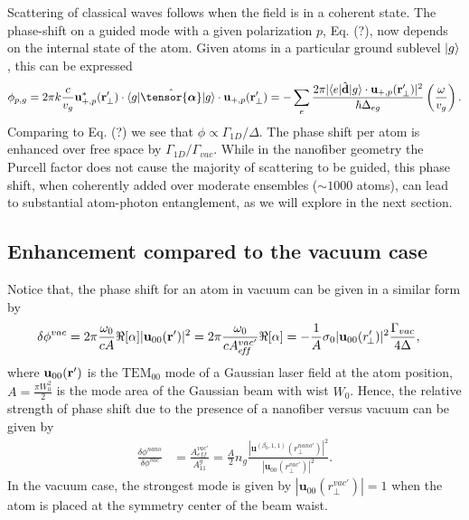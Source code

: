 \documentclass[preprint,aps,pra,onecolumn]{revtex4-1} %
\begin{document}
Scattering of classical waves follows when the field is in a coherent state.  The phase-shift on a guided mode with a given polarization $p$, Eq. (?), now depends on the internal state of the atom.  Given atoms in a particular ground sublevel $\lvert{g}\rangle$, this can be expressed
\begin{equation}
\phi_{p,g} =2\pi k \frac{c}{v_g}\mathbf{u}^*_{+, p}(\br'_\perp) \cdot \bra{g} \hat{\tensor{\boldsymbol{\alpha}}} \ket{g} \cdot \mathbf{u}_{+, p}(\br'_\perp) =-\sum_e \frac{2 \pi |\bra{e}\hat{\mathbf{d}}\ket{g} \cdot \mathbf{u}_{+,p}(\br'_\perp)|^2}{\hbar \Delta_{eg}} \left(\frac{\omega}{v_g}\right).
\end{equation}
Comparing to Eq. (?) we see that $\phi \propto \Gamma_{1D}/\Delta$.  The phase shift per atom is enhanced over free space by $\Gamma_{1D}/\Gamma_{vac}$.  While in the nanofiber geometry the Purcell factor does not cause the majority of scattering to be guided, this phase shift, when coherently added over moderate ensembles ($\sim 1000$ atoms), can lead to substantial atom-photon entanglement, as we will explore in the next section.


\subsection{Enhancement compared to the vacuum case}
Notice that, the phase shift for an atom in vacuum can be given in a similar form by
\begin{align}
\delta\phi^{vac} &= 2\pi \frac{\omega_0}{cA} \Re[\alpha] |\mathbf{u}_{00}(\mathbf{r}')|^2 =  2\pi \frac{\omega_0}{c A^{vac'}_{e\!f\!f}} \Re[\alpha]=-\frac{1}{A} \sigma_0 |\mathbf{u}_{00} (r'_{\!\perp})|^2 \frac{\Gamma_{vac}}{4\Delta},
\end{align}
where $\mathbf{u}_{00}(\mathbf{r}')  $ is the $\mathrm{TEM}_{00}$ mode of a Gaussian laser field at the atom position, $ A=\frac{\pi W_0^2}{2} $ is the mode area of the Gaussian beam with wist $ W_0 $. Hence, the relative strength of phase shift due to the presence of a nanofiber versus vacuum can be given by
\begin{align}
\frac{\delta\phi^{nano}}{\delta\phi^{vac}} &=\frac{A_{e\!f\!f}^{vac'}}{A^g_{11}}= \frac{A}{2} \!n_g\! \frac{|\mathbf{u}^{(\beta_0,1,1)}(r_\perp^{nano'})|^2}{|\mathbf{u}_{00}(r_\perp^{vac'})|^2}.
\end{align}
In the vacuum case, the strongest mode is given by $ |\mathbf{u}_{00}(r_\perp^{vac'})|=1 $ when the atom is placed at the symmetry center of the beam waist. 
\end{document}
